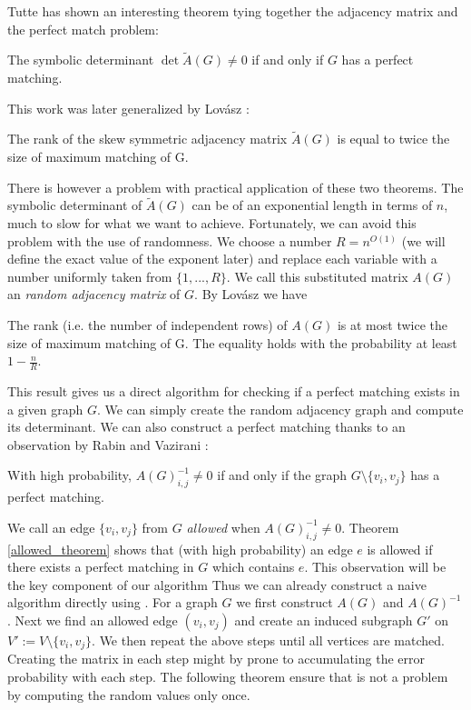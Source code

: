Tutte \cite{tutte} has shown an interesting theorem tying together the adjacency matrix and the perfect match problem:
\begin{theorem}
The symbolic determinant $\det \tilde A(G) \ne 0$ if and only if $G$ has a perfect matching.
\end{theorem}
This work was later generalized by Lovász \cite{lovasz}:
\begin{theorem}
The rank of the skew symmetric adjacency matrix $\tilde A(G)$ is equal to twice the size of maximum matching of G.
\end{theorem}
There is however a problem with practical application of these two theorems. The symbolic determinant of $\tilde A(G)$ can be of an exponential length in terms of $n$, much to slow for what we want to achieve. 
Fortunately, we can avoid this problem with the use of randomness. We choose a number $R=n^{O(1)}$ (we will define the exact value of the exponent later) and replace each variable with a number uniformly taken from $\{1,...,R\}$. We call this substituted matrix $A(G)$ an \textit{random adjacency matrix} of $G$. By Lovász \cite{lovasz} we have
\begin{theorem}
The rank (i.e. the number of independent rows) of $A(G)$ is at most twice the size of maximum matching of G. The equality holds with the probability at least $1-\frac{n}{R}$.
\end{theorem}
This result gives us a direct algorithm for checking if a perfect matching exists in a given graph $G$. We can simply create the random adjacency graph and compute its determinant. We can also construct a perfect matching thanks to an observation by Rabin and Vazirani \cite{rabin_vazirani}:
\begin{theorem}\label{allowed_theorem}
With high probability, $A(G)^{-1}_{i,j} \not= 0$ if and only if the graph $G\setminus \{v_i,v_j\}$ has a perfect matching.
\end{theorem}
We call an edge $\{v_i,v_j\}$ from $G$ \textit{allowed} when $A(G)^{-1}_{i,j}\not=0$.
Theorem \ref{allowed_theorem} shows that (with high probability) an edge $e$ is allowed if there exists a perfect matching in $G$ which contains $e$.
This observation will be the key component of our algorithm
Thus we can already construct a naive algorithm directly using .
For a graph $G$ we first construct $A(G)$ and $A(G)^{-1}$.
Next we find an allowed edge $(v_i,v_j)$ and create an induced subgraph $G'$ on $V':=V\setminus\{v_i,v_j\}$.
We then repeat the above steps until all vertices are matched.
Creating the matrix in each step might by prone to accumulating the error probability with each step.
The following theorem ensure that is not a problem by computing the random values only once.

